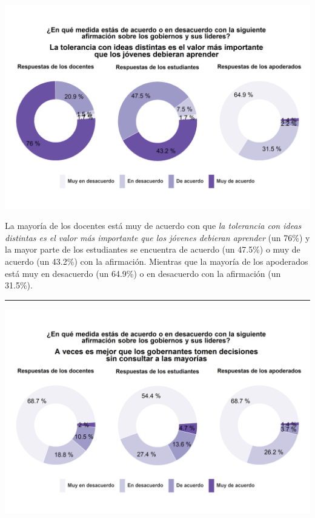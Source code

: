 \documentclass[
  14pt,
]{book}
\let\origfigure\figure
\let\endorigfigure\endfigure
\renewenvironment{figure}[1][2] {
  \expandafter\origfigure\expandafter[H]
} {
  \endorigfigure
}
\begin{document}
\begin{figure}[!ht]

{\centering \includegraphics[width=0.8\linewidth,]{images/graph_aut3} 

}

\caption{Tolerar ideas distintas es el valor más importante que debieran aprender}\label{fig:unnamed-chunk-44}
\end{figure}

La mayoría de los docentes está muy de acuerdo con que \emph{la tolerancia con ideas distintas es el valor más importante que los jóvenes debieran aprender} (un 76\%) y la mayor parte de los estudiantes se encuentra de acuerdo (un 47.5\%) o muy de acuerdo (un 43.2\%) con la afirmación. Mientras que la mayoría de los apoderados está muy en desacuerdo (un 64.9\%) o en desacuerdo con la afirmación (un 31.5\%).

\begin{center}\rule{0.5\linewidth}{0.5pt}\end{center}

\begin{figure}[!ht]

{\centering \includegraphics[width=0.8\linewidth,]{images/graph_aut4} 

}

\caption{A veces es mejor que se tomen decisiones sin consultar a las mayorías}\label{fig:unnamed-chunk-45}
\end{figure}
\end{document}
